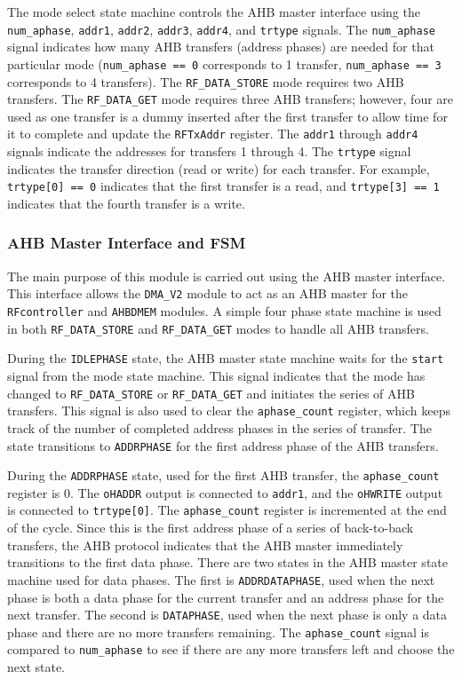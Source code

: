 The mode select state machine controls the AHB master interface using the \texttt{num\_aphase}, \texttt{addr1}, \texttt{addr2}, \texttt{addr3}, \texttt{addr4}, and \texttt{trtype} signals. The \texttt{num\_aphase} signal indicates how many AHB transfers (address phases) are needed for that particular mode (\texttt{num\_aphase == 0} corresponds to 1 transfer, \texttt{num\_aphase == 3} corresponds to 4 transfers). The \texttt{RF\_DATA\_STORE} mode requires two AHB transfers. The \texttt{RF\_DATA\_GET} mode requires three AHB transfers; however, four are used as one transfer is a dummy inserted after the first transfer to allow time for it to complete and update the \texttt{RFTxAddr} register. The \texttt{addr1} through \texttt{addr4} signals indicate the addresses for transfers 1 through 4. The \texttt{trtype} signal indicates the transfer direction (read or write) for each transfer. For example, \texttt{trtype[0] == 0} indicates that the first transfer is a read, and \texttt{trtype[3] == 1} indicates that the fourth transfer is a write.

\subsubsection{AHB Master Interface and FSM}
The main purpose of this module is carried out using the AHB master interface. This interface allows the \texttt{DMA\_V2} module to act as an AHB master for the \texttt{RFcontroller} and \texttt{AHBDMEM} modules. A simple four phase state machine is used in both \texttt{RF\_DATA\-\_STORE} and \texttt{RF\_DATA\_GET} modes to handle all AHB transfers.

During the \texttt{IDLEPHASE} state, the AHB master state machine waits for the \texttt{start} signal from the mode state machine. This signal indicates that the mode has changed to \texttt{RF\_DATA\_STORE} or \texttt{RF\_DATA\_GET} and initiates the series of AHB transfers. This signal is also used to clear the \texttt{aphase\_count} register, which keeps track of the number of completed address phases in the series of transfer. The state transitions to \texttt{ADDRPHASE} for the first address phase of the AHB transfers.

During the \texttt{ADDRPHASE} state, used for the first AHB transfer, the \texttt{aphase\_count} register is 0. The \texttt{oHADDR} output is connected to \texttt{addr1}, and the \texttt{oHWRITE} output is connected to \texttt{trtype[0]}. The \texttt{aphase\_count} register is incremented at the end of the cycle. Since this is the first address phase of a series of back-to-back transfers, the AHB protocol indicates that the AHB master immediately transitions to the first data phase. There are two states in the AHB master state machine used for data phases. The first is \texttt{ADDRDATAPHASE}, used when the next phase is both a data phase for the current transfer and an address phase for the next transfer. The second is \texttt{DATAPHASE}, used when the next phase is only a data phase and there are no more transfers remaining. The \texttt{aphase\_count} signal is compared to \texttt{num\_aphase} to see if there are any more transfers left and choose the next state.


